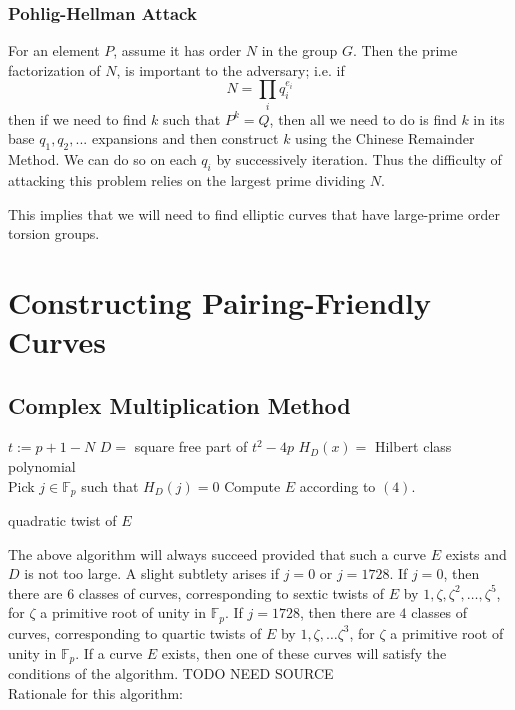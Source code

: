 \documentclass[12pt,twoside]{article}
\begin{document}
\subsubsection{Pohlig-Hellman Attack}
For an element $P$, assume it has order $N$ in the group $G$. Then the prime factorization of $N$, is important to the adversary; i.e. if 
$$ N = \prod_{i}q_{i}^{e_{i}} $$ then if we need to find $k$ such that $P^{k} = Q$, then all we need to do is find $k$ in its base $q_{1}, q_{2},...$ expansions and then construct $k$ using the Chinese Remainder Method. We can do so on each $q_{i}$ by successively iteration. Thus the difficulty of attacking this problem relies on the largest prime dividing $N$. 

This implies that we will need to find elliptic curves that have large-prime order torsion groups. 




\section{Constructing Pairing-Friendly Curves} 

\subsection{Complex Multiplication Method} 

\begin{algorithm}[H]
 $t := p+1 - N$\; 
 $D = $ square free part of $t^2-4p$\;
 $H_D(x) = $ Hilbert class polynomial \\
 Pick $j \in \mathbb F_p$ such that $H_D(j) = 0$
 Compute $E$ according to $(4)$.
 
  {
 }
 {\Return quadratic twist of $E$}
 \end{algorithm}
 \bigskip
 

 
 
 
 
 
 
\noindent The above algorithm will always succeed provided that such a curve $E$ exists and $D$ is not too large. A slight subtlety arises if $j = 0$ or $j = 1728$. If $j = 0$, then there are $6$ classes of curves, corresponding to sextic twists of $E$ by $1, \zeta, \zeta^2, \dots, \zeta^5$, for $\zeta$ a primitive root of unity in $\mathbb F_p$. If $j = 1728$, then there are $4$ classes of curves, corresponding to quartic twists of $E$ by $1, \zeta, \dots \zeta^3$, for $\zeta$ a primitive root of unity in $\mathbb F_p$. If a curve $E$ exists, then one of these curves will satisfy the conditions of the algorithm. TODO NEED SOURCE
\\ 
Rationale for this algorithm: 
\end{document}
